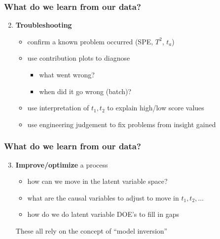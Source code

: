 \documentclass[handout, 12pt]{beamer}
\begin{document}
\begin{frame}\frametitle{What do we learn from our data?}

\begin{enumerate}
	\setcounter{enumi}{1}
	\item {\bf \color{myGreen}Troubleshooting}
	\begin{itemize}
		\item 	confirm a known problem occurred (SPE, \( T^2 \), \( t_a \))
		\item 	use contribution plots to diagnose
		\begin{itemize}
			\item 	what went wrong?
			\item 	when did it go wrong (batch)? 
		\end{itemize}\pause
		
		\item 	use interpretation of \( t_1, t_2 \) to explain high/low score values\pause
		\item 	use engineering judgement to fix problems from insight gained
	\end{itemize}
\end{enumerate}
\end{frame}
	
\begin{frame}\frametitle{What do we learn from our data?}

\begin{enumerate}
	\setcounter{enumi}{2}
	\item {\bf \color{myGreen}Improve/optimize} a process
	\begin{itemize}
		\item 	how can we move in the latent variable space?
		\item 	what are the causal variables to adjust to move in \( t_1, t_2, \ldots \)
		\item 	how do we do latent variable DOE's to fill in gaps
	\end{itemize}	
	These all rely on the concept of \alert{``model inversion''}
\end{enumerate}
\end{frame}
\end{document}
